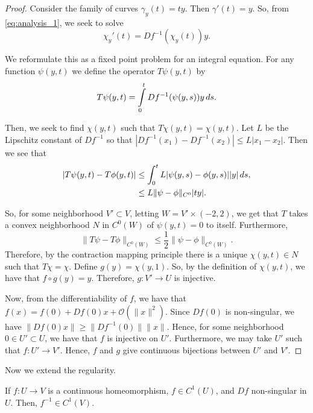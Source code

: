 \begin{proof}
Consider the family of curves $\gamma_y(t) = ty$. Then $\gamma'(t) = y$. So, from \eqref{eq:analysis_1}, we seek to solve
\begin{equation}
\chi_y'(t) = Df^{-1}(\chi_y(t)) y.
\end{equation}

We reformulate this as a fixed point problem for an integral equation. For any function $\psi(y,t)$ we define the operator $T \psi(y,t) $ by
\begin{equation}
T \psi(y,t) = \int\limits_0^t Df^{-1}(\psi(y,s)) y \, ds.
\end{equation}

Then, we seek to find $\chi(y,t)$ such that $T\chi(y,t) = \chi(y,t)$. Let $L$ be the Lipschitz constant of $Df^{-1}$ so that $|Df^{-1}(x_1) - Df^{-1}(x_2)| \leq L |x_1 - x_2|$. Then we see that
\begin{align}
|T\psi(y,t) - T\phi(y,t)| & \leq \int_0^t L|\psi(y,s) - \phi(y,s)| |y| \, ds,\\
& \leq L  \| \psi - \phi\|_{C^0} |ty|.
\end{align}

So, for some neighborhood $V' \subset V$, letting $W = V'\times(-2, 2)$, we get that $T$ takes a convex neighborhood $N$ in $C^0(W)$ of $\psi(y,t) = 0$ to itself. Furthermore, 
\begin{equation}
\|T\psi - T\phi\|_{C^0(W)} \leq \frac{1}{2} \|\psi - \phi\|_{C^0(W)}.
\end{equation}
Therefore, by the contraction mapping principle there is a unique $\chi(y,t) \in N$ such that $T\chi = \chi$. Define $g(y) = \chi(y,1)$. So, by the definition of $\chi(y,t)$, we have that $f\circ g(y) = y$. Therefore, $g: V' \to U$ is injective.

Now, from the differentiability of $f$, we have that $f(x) = f(0) + Df(0)x + \mathcal O(\|x\|^2)$. Since $Df(0)$ is non-singular, we have $\|Df(0)x\| \geq \|Df^{-1}(0)\| \|x\|$. Hence, for some neighborhood $0\in U'\subset U$, we have that $f$ is injective on $U'$. Furthermore, we may take $U'$ such that $f: U' \to V'$. Hence, $f$ and $g$ give continuous bijections between $U'$ and $V'$.
\end{proof}

Now we extend the regularity.

\begin{proposition}
If $f: U \to V$ is a continuous homeomorphism, $f\in C^1(U)$, and $Df$ non-singular in $U$. Then, $f^{-1}\in C^1(V)$.
\end{proposition}

